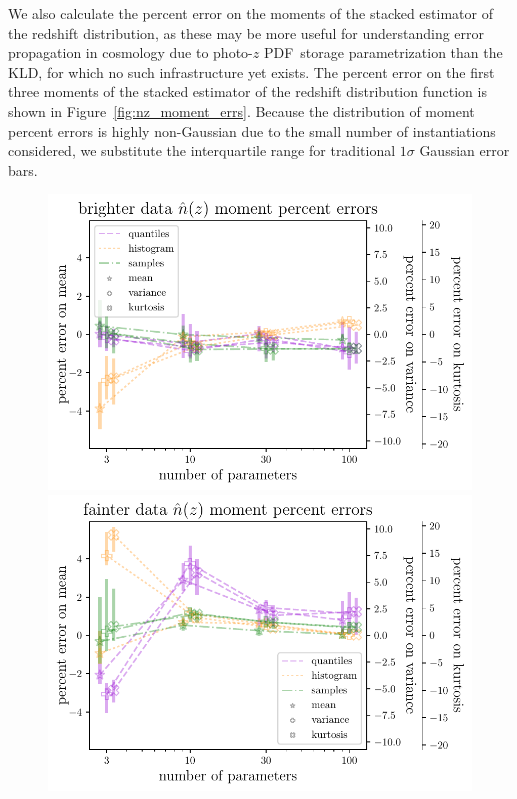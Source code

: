 \documentclass[\docopts]{\docclass}
\newcommand{\pz}{photo-$z$ PDF}
\begin{document}
We also calculate the percent error on the moments of the stacked estimator of 
the redshift distribution, as these may be more useful for understanding error 
propagation in cosmology due to \pz\ storage parametrization than the KLD, for 
which no such infrastructure yet exists.
The percent error on the first three moments of the stacked estimator of the 
redshift distribution function is shown in Figure~\ref{fig:nz_moment_errs}.
Because the distribution of moment percent errors is highly non-Gaussian due to 
the small number of instantiations considered, we substitute the interquartile 
range for traditional $1\sigma$ Gaussian error bars.
\begin{figure}
  \begin{center}
    \includegraphics[width=\columnwidth]{graham_nz_err.pdf}    
\includegraphics[width=\columnwidth]{schmidt_nz_err.pdf}

\end{center}
\end{figure}
\end{document}
